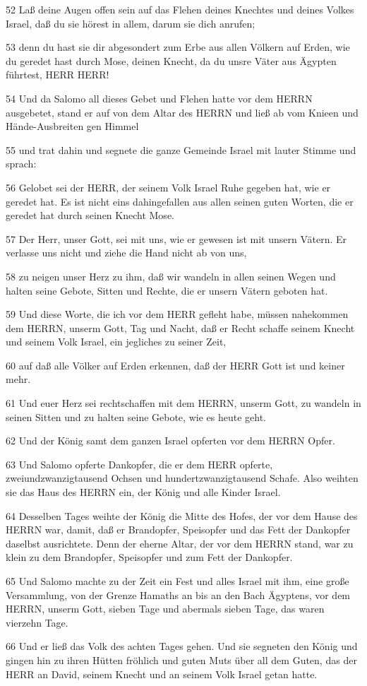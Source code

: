 \par 52 Laß deine Augen offen sein auf das Flehen deines Knechtes und deines Volkes Israel, daß du sie hörest in allem, darum sie dich anrufen;
\par 53 denn du hast sie dir abgesondert zum Erbe aus allen Völkern auf Erden, wie du geredet hast durch Mose, deinen Knecht, da du unsre Väter aus Ägypten führtest, HERR HERR!
\par 54 Und da Salomo all dieses Gebet und Flehen hatte vor dem HERRN ausgebetet, stand er auf von dem Altar des HERRN und ließ ab vom Knieen und Hände-Ausbreiten gen Himmel
\par 55 und trat dahin und segnete die ganze Gemeinde Israel mit lauter Stimme und sprach:
\par 56 Gelobet sei der HERR, der seinem Volk Israel Ruhe gegeben hat, wie er geredet hat. Es ist nicht eins dahingefallen aus allen seinen guten Worten, die er geredet hat durch seinen Knecht Mose.
\par 57 Der Herr, unser Gott, sei mit uns, wie er gewesen ist mit unsern Vätern. Er verlasse uns nicht und ziehe die Hand nicht ab von uns,
\par 58 zu neigen unser Herz zu ihm, daß wir wandeln in allen seinen Wegen und halten seine Gebote, Sitten und Rechte, die er unsern Vätern geboten hat.
\par 59 Und diese Worte, die ich vor dem HERR gefleht habe, müssen nahekommen dem HERRN, unserm Gott, Tag und Nacht, daß er Recht schaffe seinem Knecht und seinem Volk Israel, ein jegliches zu seiner Zeit,
\par 60 auf daß alle Völker auf Erden erkennen, daß der HERR Gott ist und keiner mehr.
\par 61 Und euer Herz sei rechtschaffen mit dem HERRN, unserm Gott, zu wandeln in seinen Sitten und zu halten seine Gebote, wie es heute geht.
\par 62 Und der König samt dem ganzen Israel opferten vor dem HERRN Opfer.
\par 63 Und Salomo opferte Dankopfer, die er dem HERR opferte, zweiundzwanzigtausend Ochsen und hundertzwanzigtausend Schafe. Also weihten sie das Haus des HERRN ein, der König und alle Kinder Israel.
\par 64 Desselben Tages weihte der König die Mitte des Hofes, der vor dem Hause des HERRN war, damit, daß er Brandopfer, Speisopfer und das Fett der Dankopfer daselbst ausrichtete. Denn der eherne Altar, der vor dem HERRN stand, war zu klein zu dem Brandopfer, Speisopfer und zum Fett der Dankopfer.
\par 65 Und Salomo machte zu der Zeit ein Fest und alles Israel mit ihm, eine große Versammlung, von der Grenze Hamaths an bis an den Bach Ägyptens, vor dem HERRN, unserm Gott, sieben Tage und abermals sieben Tage, das waren vierzehn Tage.
\par 66 Und er ließ das Volk des achten Tages gehen. Und sie segneten den König und gingen hin zu ihren Hütten fröhlich und guten Muts über all dem Guten, das der HERR an David, seinem Knecht und an seinem Volk Israel getan hatte.

